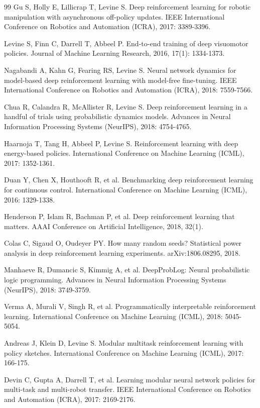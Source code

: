 \documentclass[12pt,a4paper]{ctexart}
\begin{document}
\begin{thebibliography}{99}
 Gu S, Holly E, Lillicrap T, Levine S. Deep reinforcement learning for robotic manipulation with asynchronous off-policy updates. IEEE International Conference on Robotics and Automation (ICRA), 2017: 3389-3396.

 Levine S, Finn C, Darrell T, Abbeel P. End-to-end training of deep visuomotor policies. Journal of Machine Learning Research, 2016, 17(1): 1334-1373.

 Nagabandi A, Kahn G, Fearing RS, Levine S. Neural network dynamics for model-based deep reinforcement learning with model-free fine-tuning. IEEE International Conference on Robotics and Automation (ICRA), 2018: 7559-7566.

 Chua R, Calandra R, McAllister R, Levine S. Deep reinforcement learning in a handful of trials using probabilistic dynamics models. Advances in Neural Information Processing Systems (NeurIPS), 2018: 4754-4765.

 Haarnoja T, Tang H, Abbeel P, Levine S. Reinforcement learning with deep energy-based policies. International Conference on Machine Learning (ICML), 2017: 1352-1361.

 Duan Y, Chen X, Houthooft R, et al. Benchmarking deep reinforcement learning for continuous control. International Conference on Machine Learning (ICML), 2016: 1329-1338.

 Henderson P, Islam R, Bachman P, et al. Deep reinforcement learning that matters. AAAI Conference on Artificial Intelligence, 2018, 32(1).

 Colas C, Sigaud O, Oudeyer PY. How many random seeds? Statistical power analysis in deep reinforcement learning experiments. arXiv:1806.08295, 2018.

 Manhaeve R, Dumancic S, Kimmig A, et al. DeepProbLog: Neural probabilistic logic programming. Advances in Neural Information Processing Systems (NeurIPS), 2018: 3749-3759.

 Verma A, Murali V, Singh R, et al. Programmatically interpretable reinforcement learning. International Conference on Machine Learning (ICML), 2018: 5045-5054.

 Andreas J, Klein D, Levine S. Modular multitask reinforcement learning with policy sketches. International Conference on Machine Learning (ICML), 2017: 166-175.

 Devin C, Gupta A, Darrell T, et al. Learning modular neural network policies for multi-task and multi-robot transfer. IEEE International Conference on Robotics and Automation (ICRA), 2017: 2169-2176.


\end{thebibliography}
\end{document}
